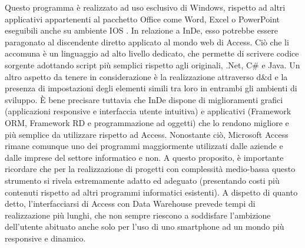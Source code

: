 Questo programma è realizzato ad uso esclusivo di Windows, rispetto ad altri applicativi appartenenti al pacchetto Office come Word, Excel o PowerPoint eseguibili anche su ambiente IOS \cite{[20]}.
In relazione a InDe, esso potrebbe essere paragonato al discendente diretto applicato al mondo web di Access. Ciò che li accomuna è un linguaggio ad alto livello dedicato, che permette di scrivere codice sorgente adottando script più semplici rispetto agli originali, .Net, C\# e Java. Un altro aspetto da tenere in considerazione è la realizzazione attraverso d\&d e la presenza di impostazioni degli elementi simili tra loro in entrambi gli ambienti di sviluppo.
È bene precisare tuttavia che InDe dispone di miglioramenti grafici (applicazioni responsive e interfaccia utente intuitiva)  e applicativi (Framework ORM, Framework RD e programmazione ad oggetti) che lo rendono migliore e più semplice da utilizzare rispetto ad Access.
Nonostante ciò, Microsoft Access rimane comunque uno dei programmi maggiormente utilizzati dalle aziende e dalle imprese del settore informatico e non.
A questo proposito, è importante ricordare che per la realizzazione di progetti con complessità medio-bassa questo strumento si rivela estremamente adatto ed adeguato (presentando costi più contenuti rispetto ad altri programmi informatici esistenti).
A dispetto di quanto detto, l'interfacciarsi di Access con Data Warehouse prevede tempi di realizzazione più lunghi, che non sempre riescono a soddisfare l'ambizione dell'utente abituato anche solo per l'uso di uno smartphone ad un mondo più responsive e dinamico. 

